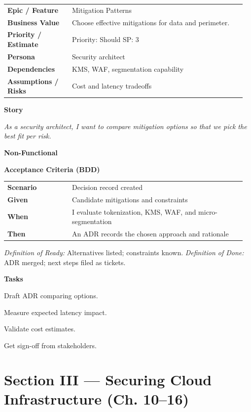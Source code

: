 \documentclass[11pt,letterpaper]{article}
\makeatletter
\newenvironment{kvtable}{%
  \par\noindent\begin{tabular}{@{}>{\raggedright\bfseries\arraybackslash}p{0.26\linewidth} >{\raggedright\arraybackslash}p{0.70\linewidth}@{}}
}{\end{tabular}\par}
\newenvironment{bdd}{%
  \par\noindent\begin{tabular}{@{}>{\raggedright\bfseries\arraybackslash}p{0.26\linewidth} >{\raggedright\arraybackslash}p{0.70\linewidth}@{}}
}{\end{tabular}\par}
\newcommand{\DoRDoD}[2]{%
  \vspace{0.35em}
  {\footnotesize\color{Muted}%
    \textit{Definition of Ready:} #1 \; \textbullet\;
    \textit{Definition of Done:} #2%
  }%
}
\newenvironment{storycard}[2]{%
  \begin{tcolorbox}[cloudcard, title={#1 --- #2}]%
}{\end{tcolorbox}}
\newcommand{\sectionlabel}[1]{\par\vspace{0.35em}\textbf{#1}\par}
\makeatother
\begin{document}
\begin{storycard}{CCS-9}{Ch. 9 — Risk Mitigation Methods}
\begin{kvtable}
Epic / Feature & Mitigation Patterns\\
Business Value & Choose effective mitigations for data and perimeter.\\
Priority / Estimate & Priority: Should \quad SP: 3\\
Persona & Security architect\\
Dependencies & KMS, WAF, segmentation capability\\
Assumptions / Risks & Cost and latency tradeoffs\\
\end{kvtable}
\sectionlabel{Story}
\textit{As a security architect, I want to compare mitigation options so that we pick the best fit per risk.}
\sectionlabel{Non-Functional}\;
\sectionlabel{Acceptance Criteria (BDD)}
\begin{bdd}
Scenario & Decision record created\\
Given & Candidate mitigations and constraints\\
When & I evaluate tokenization, KMS, WAF, and micro-segmentation\\
Then & An ADR records the chosen approach and rationale\\
\end{bdd}
\DoRDoD{Alternatives listed; constraints known.}{ADR merged; next steps filed as tickets.}
\sectionlabel{Tasks}
\begin{checklist}
\item Draft ADR comparing options.
\item Measure expected latency impact.
\item Validate cost estimates.
\item Get sign-off from stakeholders.
\end{checklist}
\end{storycard}

\section{Section III — Securing Cloud Infrastructure (Ch. 10--16)}
\end{document}
